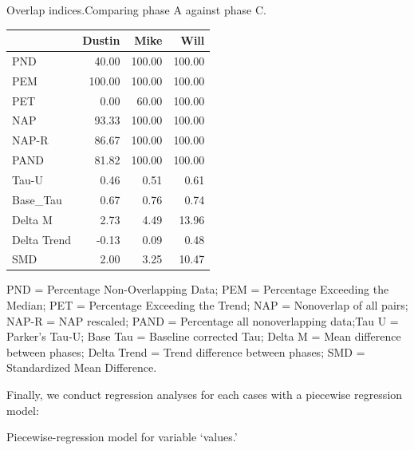 \documentclass[
]{book}
\newenvironment{Shaded}{\begin{snugshade}}{\end{snugshade}}
\newcommand{\FunctionTok}[1]{\textcolor[rgb]{0.00,0.00,0.00}{#1}}
\newcommand{\NormalTok}[1]{#1}
\newcommand{\SpecialCharTok}[1]{\textcolor[rgb]{0.00,0.00,0.00}{#1}}
\begin{document}
Overlap indices.Comparing phase A against phase C.

\begin{table}
\centering
\begin{tabular}{lrrr}
\toprule
  & Dustin & Mike & Will\\
\midrule
PND & 40.00 & 100.00 & 100.00\\
PEM & 100.00 & 100.00 & 100.00\\
PET & 0.00 & 60.00 & 100.00\\
NAP & 93.33 & 100.00 & 100.00\\
NAP-R & 86.67 & 100.00 & 100.00\\
\addlinespace
PAND & 81.82 & 100.00 & 100.00\\
Tau-U & 0.46 & 0.51 & 0.61\\
Base\_Tau & 0.67 & 0.76 & 0.74\\
Delta M & 2.73 & 4.49 & 13.96\\
Delta Trend & -0.13 & 0.09 & 0.48\\
\addlinespace
SMD & 2.00 & 3.25 & 10.47\\
\bottomrule
\end{tabular}
\end{table}

PND = Percentage Non-Overlapping Data; PEM = Percentage Exceeding the Median; PET = Percentage Exceeding the Trend; NAP = Nonoverlap of all pairs; NAP-R = NAP rescaled;
PAND = Percentage all nonoverlapping data;Tau U = Parker's Tau-U; Base Tau = Baseline corrected Tau; Delta M = Mean difference between phases; Delta Trend = Trend difference between phases; SMD = Standardized Mean Difference.

Finally, we conduct regression analyses for each cases with a piecewise regression model:

\begin{Shaded}
\end{Shaded}

Piecewise-regression model for variable `values.'
\end{document}
